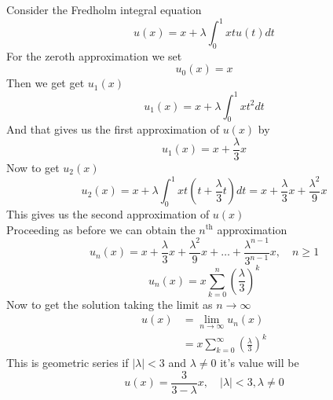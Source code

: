 \documentclass[]{article}
\begin{document}
\begin{example}
    Consider the Fredholm integral equation 
    \[
        u(x) = x + \lambda\int_{0}^{1} xt u(t)dt
    \]
    For the zeroth approximation we set 
    \[
    u_0(x) = x
    \]
    Then we get get $u_1(x)$
    \[
        u_1(x) = x + \lambda\int_{0}^{1} xt^2dt
    \]
    And that gives us the first approximation of $u(x)$ by
    \[
        u_1(x) = x + \frac{\lambda}{3}x
    \]
    Now to get $u_2(x)$
    \[
        u_2(x) = x + \lambda\int_{0}^{1} xt\left(t + \frac{\lambda}{3}t\right)dt = x +\frac{\lambda}{3} x +\frac{\lambda^2}{9} x
    \]
    This gives us the second approximation of $u(x)$
    \\
    Proceeding as before we can obtain the $n^{\text{th}}$ approximation
    \[
        u_n(x) = x +\frac{\lambda}{3} x +\frac{\lambda^2}{9} x + \dots + \frac{\lambda^{n-1}}{3^{n-1}} x , \quad n \geq 1
    \]
    \[
        u_n(x) = x\sum_{k=0}^{n} {\left(\frac{\lambda}{3}\right)}^{k}
    \]
    Now to get the solution taking the limit as $n \to \infty$
    \begin{align*}
        u(x) &= \lim_{n\to\infty} u_n(x)
        \\
        &= x\sum_{k=0}^{\infty} {\left(\frac{\lambda}{3}\right)}^{k}
    \end{align*}
    This is geometric series if $|\lambda| < 3$ and $\lambda \neq 0$ it's value will be 
    \[
    u(x) = \frac{3}{3-\lambda}x, \quad  |\lambda| < 3,\lambda \neq 0
    \]
\end{example}
\end{document}
